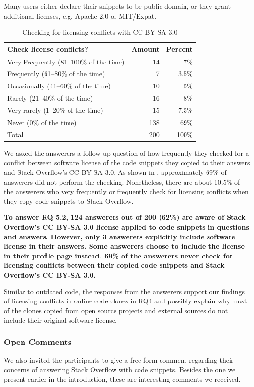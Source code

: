 \documentclass[10pt,journal,compsoc]{IEEEtran}
\begin{document}
Many users either declare their snippets to be public domain, or they grant
additional licenses, e.g. Apache 2.0 or MIT/Expat.

\begin{table}
	\centering
	\caption{Checking for licensing conflicts with CC BY-SA 3.0}
	\label{tab:survey_license_check}
	\begin{tabular}{lrr}
		\toprule
		Check license conflicts? & Amount & Percent \\
		\midrule
		Very Frequently (81--100\% of the time)	& 14 & 7\% \\
		Frequently (61--80\% of the time) & 7 & 3.5\% \\
		Occasionally (41--60\% of the time) & 10 & 5\% \\
		Rarely (21--40\% of the time) & 16 & 8\% \\
		Very rarely (1--20\% of the time) & 15 & 7.5\% \\
		Never (0\% of the time) & 138 & 69\% \\
		\midrule
		Total & 200 & 100\% \\
		\bottomrule
	\end{tabular}
\end{table}

We asked the answerers a follow-up question of how frequently they checked for a
conflict between software license of the code snippets they copied to their
answers and Stack Overflow's CC BY-SA 3.0. As shown in
, approximately 69\% of answerers did not perform
the checking. Nonetheless, there are about 10.5\% of the answerers who very
frequently or frequently check for licensing conflicts when they copy code
snippets to Stack Overflow.

\textbf{To answer RQ 5.2, 124 answerers out of 200 (62\%) are aware of Stack Overflow's
CC BY-SA 3.0 license applied to code snippets in questions and answers. However,
only 3 answerers explicitly include software license in their answers. Some 
answerers choose to include the license in their profile page instead. 69\% of the
answerers never check for licensing conflicts between their copied code snippets
and Stack Overflow's CC BY-SA 3.0.}

Similar to outdated code, the responses from the answerers support our findings
of licensing conflicts in online code clones in RQ4 and possibly explain why most of
the clones copied from open source projects and external sources do not include
their original software license.

\subsubsection{Open Comments} We also invited the participants to give a
free-form comment regarding their concerns of answering Stack Overflow with code
snippets. Besides the one we present earlier in the introduction, these are
interesting comments we received.
\end{document}
